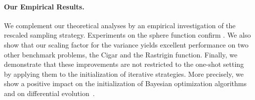 \paragraph{Our Empirical Results.} 
We complement our theoretical analyses by an empirical investigation of the rescaled sampling strategy. Experiments on the sphere function confirm . We also show that our scaling factor for the variance yields excellent performance on two other benchmark problems, the Cigar and the Rastrigin function. Finally, we demonstrate that these improvements are not restricted to the one-shot setting by applying them to the initialization of iterative  %
strategies. More precisely, we show a positive impact on the initialization of Bayesian optimization algorithms~\cite{ego} and on differential evolution~\cite{de}.   
% 

